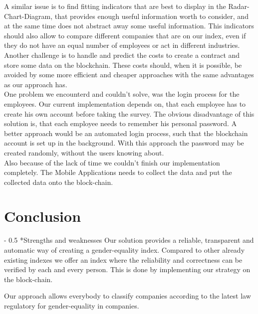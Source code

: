\documentclass[portrait,a4paper]{article}
\makeatletter
\renewcommand\paragraph{\@startsection{paragraph}{4}{0mm}%
	{-\baselineskip}%
	{0.5\baselineskip}%
	{\normalfont\bfseries}%
}%
\makeatother
\begin{document}
		A similar issue is to find fitting indicators that are best to display in the Radar-Chart-Diagram, that provides
		enough useful information worth to consider, and at the same time does not abstract away some useful information.
		This indicators should also allow to compare different companies that are on our index, even if they do not have
		an equal number of employees or act in different industries.\\
		
		Another challenge is to handle and predict the costs to create a contract and store some data on the blockchain.
		These costs should, when it is possible, be avoided by some more efficient and cheaper approaches with
		the same advantages as our approach has.\\
		
		One problem we encounterd and couldn't solve, was the login process for the employees. 
		Our current implementation depends on, that each employee has to create his own account before taking the survey.
		The obvious disadvantage of this solution is, that each employee needs to remember his personal password. 
		A better approach would be an automated login process, such that the blockchain account is set up in the
		background. With this approach the password may be created randomly, without the users knowing about.\\

		Also because of the lack of time we couldn't finish our implementation completely. 
		The Mobile Applications needs to collect the data and put the collected data onto the block-chain.


\section{Conclusion}
	\paragraph*{Strengths and weaknesses}
		Our solution provides a reliable, transparent and automatic way of creating a gender-equality index. 
		Compared to other already existing indexes we offer an index where the reliability and correctness 
		can be verified by each and every person. This is done by implementing our strategy on the block-chain.
		
		Our approach allows everybody to classify companies according to the latest law regulatory for gender-equality in companies.
		
\end{document}
